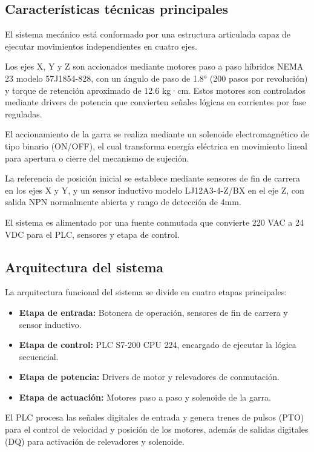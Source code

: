 \documentclass[a4paper,12pt]{article}
\begin{document}
\newpage
\subsection{Características técnicas principales}

El sistema mecánico está conformado por una estructura articulada capaz de ejecutar movimientos independientes en cuatro ejes.

Los ejes X, Y y Z son accionados mediante motores paso a paso híbridos NEMA 23 modelo 57J1854-828, con un ángulo de paso de 1.8° (200 pasos por revolución) y torque de retención aproximado de 12.6 kg·cm. Estos motores son controlados mediante drivers de potencia que convierten señales lógicas en corrientes por fase reguladas.

El accionamiento de la garra se realiza mediante un solenoide electromagnético de tipo binario (ON/OFF), el cual transforma energía eléctrica en movimiento lineal para apertura o cierre del mecanismo de sujeción.

La referencia de posición inicial se establece mediante sensores de fin de carrera en los ejes X y Y, y un sensor inductivo modelo LJ12A3-4-Z/BX en el eje Z, con salida NPN normalmente abierta y rango de detección de 4mm.

El sistema es alimentado por una fuente conmutada que convierte 220 VAC a 24 VDC para el PLC, sensores y etapa de control.

\subsection{Arquitectura del sistema}

La arquitectura funcional del sistema se divide en cuatro etapas principales:

\begin{itemize}
\item \textbf{Etapa de entrada:} Botonera de operación, sensores de fin de carrera y sensor inductivo.
\item \textbf{Etapa de control:} PLC S7-200 CPU 224, encargado de ejecutar la lógica secuencial.
\item \textbf{Etapa de potencia:} Drivers de motor y relevadores de conmutación.
\item \textbf{Etapa de actuación:} Motores paso a paso y solenoide de la garra.
\end{itemize}

El PLC procesa las señales digitales de entrada y genera trenes de pulsos (PTO) para el control de velocidad y posición de los motores, además de salidas digitales (DQ) para activación de relevadores y solenoide.
\end{document}

